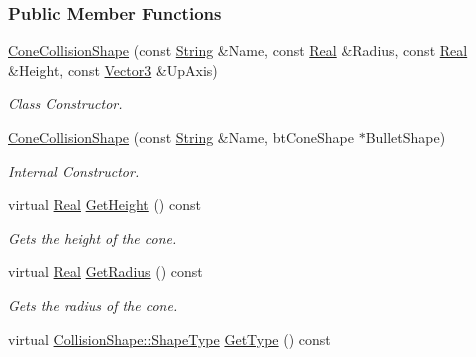 \subsubsection*{Public Member Functions}
\begin{DoxyCompactItemize}
\item 
\hyperlink{classphys_1_1ConeCollisionShape_a542f28c210cc27cc488c0fc0f3ccfee6}{ConeCollisionShape} (const \hyperlink{namespacephys_aa03900411993de7fbfec4789bc1d392e}{String} \&Name, const \hyperlink{namespacephys_af7eb897198d265b8e868f45240230d5f}{Real} \&Radius, const \hyperlink{namespacephys_af7eb897198d265b8e868f45240230d5f}{Real} \&Height, const \hyperlink{classphys_1_1Vector3}{Vector3} \&UpAxis)
\begin{DoxyCompactList}\small\item\em Class Constructor. \item\end{DoxyCompactList}\item 
\hyperlink{classphys_1_1ConeCollisionShape_a4a02fb6a7be0617f26e92a331896fad6}{ConeCollisionShape} (const \hyperlink{namespacephys_aa03900411993de7fbfec4789bc1d392e}{String} \&Name, btConeShape $\ast$BulletShape)
\begin{DoxyCompactList}\small\item\em Internal Constructor. \item\end{DoxyCompactList}\item 
virtual \hyperlink{namespacephys_af7eb897198d265b8e868f45240230d5f}{Real} \hyperlink{classphys_1_1ConeCollisionShape_a9c8243745e912a79b1146b828bb8a8df}{GetHeight} () const 
\begin{DoxyCompactList}\small\item\em Gets the height of the cone. \item\end{DoxyCompactList}\item 
virtual \hyperlink{namespacephys_af7eb897198d265b8e868f45240230d5f}{Real} \hyperlink{classphys_1_1ConeCollisionShape_a602322d3869873c6d30df5706da6a329}{GetRadius} () const 
\begin{DoxyCompactList}\small\item\em Gets the radius of the cone. \item\end{DoxyCompactList}\item 
virtual \hyperlink{classphys_1_1CollisionShape_af3ba4fd8af5b9557f912d2f5ff35a588}{CollisionShape::ShapeType} \hyperlink{classphys_1_1ConeCollisionShape_a18a76d3f11c94c80188e9560af32e899}{GetType} () const 

\end{DoxyCompactItemize}
